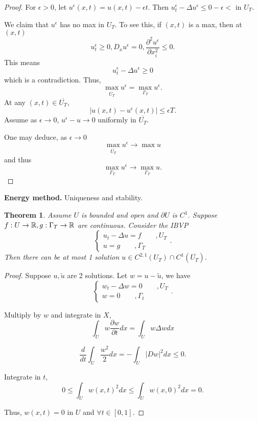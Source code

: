 \documentclass[11pt]{amsart}%
\newtheorem{theorem}{Theorem}
\begin{document}
\begin{proof}
    For $\epsilon >0$, let $u^\epsilon(x,t)=u(x,t)-\epsilon t$. Then $u_t^\epsilon - \Delta u^\epsilon \le 0-\epsilon <$ in $U_T$.
    
    We claim that $u^\epsilon$ has no max in $U_T$. To see this, if $(x,t)$ is a max, then at $(x,t)$
    $$u_t^\epsilon \ge 0, D_xu^\epsilon =0, \frac{\partial^2 u^\epsilon}{\partial x_i^2}\le 0.$$ This means
    $$u_t^\epsilon -\Delta u^\epsilon \ge 0$$ which is a contradiction. Thus,
    $$\max_{\overline{U_T}}u^\epsilon = \max_{\Gamma_T} u^\epsilon.$$ At any $(x,t)\in \overline{U_T}$,
    $$\vert u(x,t) - u^\epsilon(x,t)\vert \le \epsilon T.$$
    Assume as $\epsilon\to 0$, $u^\epsilon - u \to 0$ uniformly in $\overline{U_T}$. 
    
    One may deduce, as $\epsilon\to 0$
    $$\max_{\overline{U_T}} u^\epsilon\to \max u$$
    and thus
    $$\max_{\Gamma_T} u^\epsilon \to \max_{\Gamma_T} u.$$
\end{proof}

{\bf Energy method.} Uniqueness and stability.

\begin{theorem}
    Assume $U$ is bounded and open and $\partial U$ is $C^1$. Suppose $f:U\to \mathbb{R}, g: \Gamma_T \to \mathbb{R}$ are continuous. Consider the IBVP
    $$\begin{cases}
        u_t-\Delta u = f \qquad, U_T\\
        u=g \qquad, \Gamma_T
    \end{cases}.$$
    Then there can be at most 1 solution $u\in C^{2,1}(U_T)\cap C^1(\overline{U_T})$.
\end{theorem}

\begin{proof}
    Suppose $u, \tilde{u}$ are 2 solutions. Let $w=u-\tilde{u}$, we have
    $$\begin{cases}
        w_t -\Delta w =0 \qquad, U_T\\
        w=0 \qquad, \Gamma_t
    \end{cases}.$$
    
    Multiply by $w$ and integrate in $X$,
    $$\int_U w\frac{\partial w}{\partial t} dx =\int_U w\Delta w dx$$
    
    $$\frac{d}{dt}\int_U \frac{w^2}{2}dx = -\int_U \vert Dw\vert^2 dx \le 0.$$
    
    Integrate in $t$,
    $$0\le \int_U w(x,t)^2 dx \le \int_U w(x,0)^2dx=0.$$
    
    Thus, $w(x,t)=0$ in $U$ and $\forall t\in [0,1]$.
\end{proof}
\end{document}
